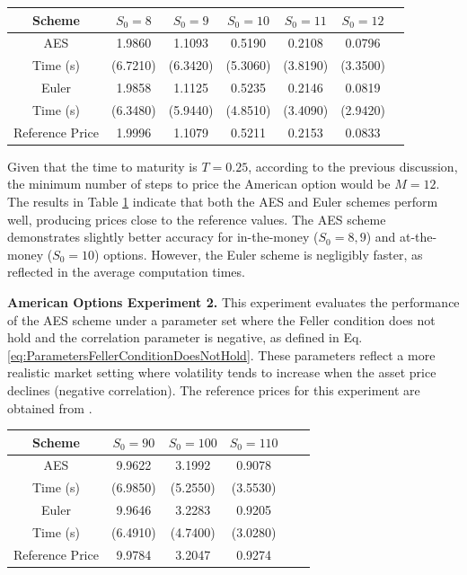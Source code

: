 \documentclass[]{interact}
\theoremstyle{plain}%
\theoremstyle{definition}
\theoremstyle{remark}
\begin{document}
\begin{table}
{\begin{tabular}{ccccccc} 
\toprule
Scheme &  $S_0 = 8$ & $S_0 = 9$ & $S_0 = 10$ & $S_0 = 11$ & $S_0 = 12$ \\ 
\midrule
AES    &  1.9860 & 1.1093 & 0.5190 & 0.2108 & 0.0796 \\ 
Time (s) & (6.7210) & (6.3420) & (5.3060) & (3.8190) & (3.3500) \\ 
\midrule
Euler  &  1.9858 & 1.1125 & 0.5235 & 0.2146 & 0.0819 \\ 
Time (s) &  (6.3480) & (5.9440) & (4.8510) & (3.4090) & (2.9420) \\ 
\midrule
Reference Price &   1.9996 & 1.1079 & 0.5211 & 0.2153 & 0.0833 \\
\bottomrule
\end{tabular}}
\label{table:AmericanOptions}
\end{table}

Given that the time to maturity is $T = 0.25$, according to the previous discussion, the minimum number of steps to price the American option would be $M = 12$. The results in Table \ref{table:AmericanOptions} indicate that both the AES and Euler schemes perform well, producing prices close to the reference values. The AES scheme demonstrates slightly better accuracy for in-the-money (\( S_0 = 8, 9 \)) and at-the-money (\( S_0 = 10 \)) options. However, the Euler scheme is negligibly faster, as reflected in the average computation times.

\textbf{American Options Experiment 2.} This experiment evaluates the performance of the AES scheme under a parameter set where the Feller condition does not hold and the correlation parameter is negative, as defined in Eq. \eqref{eq:ParametersFellerConditionDoesNotHold}. These parameters reflect a more realistic market setting where volatility tends to increase when the asset price declines (negative correlation). The reference prices for this experiment are obtained from \cite{haentjens2015adi}.




\begin{table}
{\begin{tabular}{cccccc} 
\toprule
Scheme & $S_0 = 90$ & $S_0 = 100$ & $S_0 = 110$ \\ 
\midrule
AES    & 9.9622 & 3.1992 & 0.9078 \\ 
Time (s) & (6.9850) & (5.2550) & (3.5530) \\ 
\midrule
Euler  & 9.9646 & 3.2283 & 0.9205 \\ 
Time (s) & (6.4910) & (4.7400) & (3.0280) \\ 
\midrule
Reference Price & 9.9784 & 3.2047 & 0.9274 \\
\bottomrule
\end{tabular}}
\label{table:Options}
\end{table}
\end{document}

